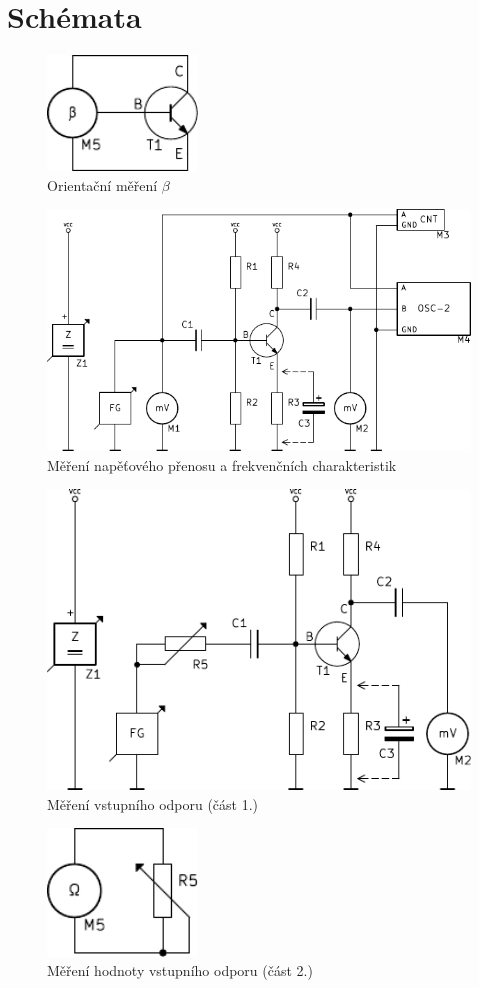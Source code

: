 \section*{Schémata}
  \begin{figure}[H]
    \centering
    \includegraphics[width=4cm]{../img/BETA.pdf}
    \caption{Orientační měření $\beta$}
    \label{sch:2}
  \end{figure}
  
  \begin{figure}[H]
    \centering
    \includegraphics[width=18cm]{../img/SCH1.pdf}
    \caption{Měření napěťového přenosu a frekvenčních charakteristik}
    \label{sch:2}
  \end{figure}
  
  \begin{figure}[H]
    \centering
    \includegraphics[width=16cm]{../img/SCH2.pdf}
    \caption{Měření vstupního odporu (část 1.)}
    \label{sch:2}
  \end{figure}
  
  \begin{figure}[H]
    \centering
    \includegraphics[width=4cm]{../img/OHM.pdf}
    \caption{Měření hodnoty vstupního odporu (část 2.)}
    \label{sch:2}
  \end{figure}

